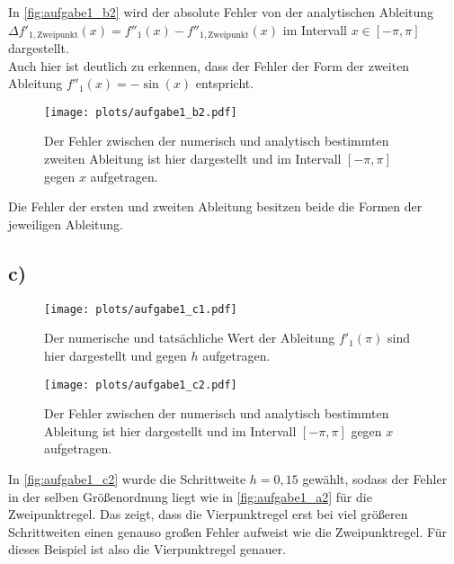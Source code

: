     In \autoref{fig:aufgabe1_b2} wird der absolute Fehler von der analytischen Ableitung $\Delta f'_{\mathrm{1,Zweipunkt}}(x) = f''_1(x) - f''_{\mathrm{1,Zweipunkt}}(x)$ im Intervall $x \in [-\pi, \pi]$ dargestellt. \\
    Auch hier ist deutlich zu erkennen, dass der Fehler der Form der zweiten Ableitung $f''_1(x) = -\sin(x)$ entspricht.

    \begin{figure}[H]
      \centering
      \texttt{[image: plots/aufgabe1\_b2.pdf]} \vspace*{-0.6cm}
      \caption{Der Fehler zwischen der numerisch und analytisch bestimmten zweiten Ableitung ist hier dargestellt und im Intervall $[-\pi, \pi]$ gegen $x$ aufgetragen.}
      \label{fig:aufgabe1_b2}
    \end{figure}
    \FloatBarrier

    Die Fehler der ersten und zweiten Ableitung besitzen beide die Formen der jeweiligen Ableitung.

  \subsection{c)}
    \begin{figure}[H]
      \centering
      \texttt{[image: plots/aufgabe1\_c1.pdf]} \vspace*{-0.6cm}
      \caption{Der numerische und tatsächliche Wert der Ableitung $f'_1(\pi)$ sind hier dargestellt und gegen $h$ aufgetragen.}
      \label{fig:aufgabe1_c1}
    \end{figure}
    \FloatBarrier

    \begin{figure}[H]
      \centering
      \texttt{[image: plots/aufgabe1\_c2.pdf]} \vspace*{-0.6cm}
      \caption{Der Fehler zwischen der numerisch und analytisch bestimmten Ableitung ist hier dargestellt und im Intervall $[-\pi, \pi]$ gegen $x$ aufgetragen.}
      \label{fig:aufgabe1_c2}
    \end{figure}
    \FloatBarrier
    
    In \autoref{fig:aufgabe1_c2} wurde die Schrittweite $h = 0,15$ gewählt, sodass der Fehler in der selben Größenordnung liegt wie in \autoref{fig:aufgabe1_a2} für die Zweipunktregel.
    Das zeigt, dass die Vierpunktregel erst bei viel größeren Schrittweiten einen genauso großen Fehler aufweist wie die Zweipunktregel.
    Für dieses Beispiel ist also die Vierpunktregel genauer.

